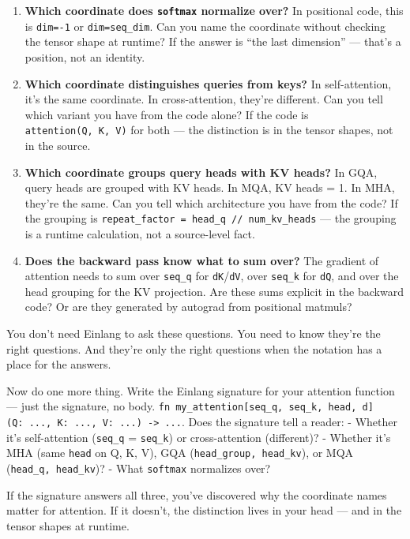 \documentclass[11pt,titlepage]{article}
\begin{document}
\begin{enumerate}
\def\labelenumi{\arabic{enumi}.}
\item
  \textbf{Which coordinate does \texttt{softmax} normalize over?} In
  positional code, this is \texttt{dim=-1} or \texttt{dim=seq\_dim}. Can
  you name the coordinate without checking the tensor shape at runtime?
  If the answer is ``the last dimension'' --- that's a position, not an
  identity.
\item
  \textbf{Which coordinate distinguishes queries from keys?} In
  self-attention, it's the same coordinate. In cross-attention, they're
  different. Can you tell which variant you have from the code alone? If
  the code is \texttt{attention(Q,\ K,\ V)} for both --- the distinction
  is in the tensor shapes, not in the source.
\item
  \textbf{Which coordinate groups query heads with KV heads?} In GQA,
  query heads are grouped with KV heads. In MQA, KV heads = 1. In MHA,
  they're the same. Can you tell which architecture you have from the
  code? If the grouping is
  \texttt{repeat\_factor\ =\ head\_q\ //\ num\_kv\_heads} --- the
  grouping is a runtime calculation, not a source-level fact.
\item
  \textbf{Does the backward pass know what to sum over?} The gradient of
  attention needs to sum over \texttt{seq\_q} for
  \texttt{dK}/\texttt{dV}, over \texttt{seq\_k} for \texttt{dQ}, and
  over the head grouping for the KV projection. Are these sums explicit
  in the backward code? Or are they generated by autograd from
  positional matmuls?
\end{enumerate}

You don't need Einlang to ask these questions. You need to know they're
the right questions. And they're only the right questions when the
notation has a place for the answers.

Now do one more thing. Write the Einlang signature for your attention
function --- just the signature, no body.
\texttt{fn\ my\_attention{[}seq\_q,\ seq\_k,\ head,\ d{]}(Q:\ ...,\ K:\ ...,\ V:\ ...)\ -\textgreater{}\ ...}.
Does the signature tell a reader: - Whether it's self-attention
(\texttt{seq\_q} = \texttt{seq\_k}) or cross-attention (different)? -
Whether it's MHA (same \texttt{head} on Q, K, V), GQA
(\texttt{head\_group,\ head\_kv}), or MQA (\texttt{head\_q,\ head\_kv})?
- What \texttt{softmax} normalizes over?

If the signature answers all three, you've discovered why the coordinate
names matter for attention. If it doesn't, the distinction lives in your
head --- and in the tensor shapes at runtime.
\end{document}
